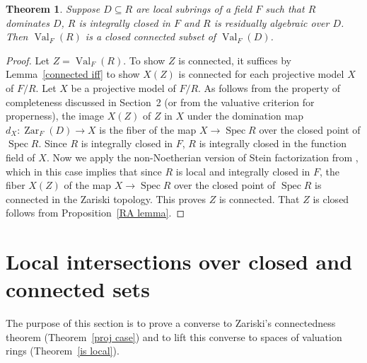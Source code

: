 \documentclass[preprint, 11pt,nonatbib]{elsarticle}
\DeclareMathOperator{\Dom}{Val}
\DeclareMathOperator{\Spec}{Spec}
\DeclareMathOperator{\Zar}{Zar}
\newtheorem{theorem}{Theorem}
\theoremstyle{definition}
\numberwithin{theorem}{section}
\begin{document}
\begin{theorem} \label{first direction} Suppose $D \subseteq R$ are local subrings of a field $F$ such that $R$ dominates $D$, $R$ is integrally closed in $F$ and $R$ is residually algebraic over $D$. Then   $\Dom_F(R)$ is a closed connected subset   of $\Dom_F(D)$.  
\end{theorem}

\begin{proof} 


Let $Z=\Dom_F(R)$. To show $Z$ is connected, it suffices by  Lemma~\ref{connected iff} to show $X(Z )$ is connected for each projective model $X$ of $F/R$. Let $X$ be a projective model of $F/R$. 
As follows from the property of completeness discussed in Section~2 (or from the valuative criterion for properness), the image $X(Z)$ of $Z$ in $X$ under the domination map $d_X:\Zar_F(D) \rightarrow X$ is the fiber of
 the map $X \rightarrow \Spec R$ over the closed point 
  of $\Spec R$. Since  $R$ is integrally  closed in $F$, 
$R$ is integrally closed in the   
   function field of $X$. 
Now we apply the non-Noetherian version of Stein factorization from \cite[{Tag~03H2}]{stacks-project}, which in this case implies that since $R$ is  local and integrally closed in $F$, the fiber $X(Z)$ of the map
  $X \rightarrow \Spec R$ over the closed point 
  of $\Spec R$ is
     connected in the Zariski topology.
This proves
    ${Z}$ is connected. That $Z$ is closed follows from Proposition~\ref{RA lemma}. 
\end{proof} 
 



\section{Local intersections over closed and connected sets} 

The purpose of this section is to prove a   converse to  Zariski's  connectedness theorem (Theorem~\ref{proj case}) and to lift this converse to spaces of valuation rings (Theorem~\ref{is local}).  

\end{document}
